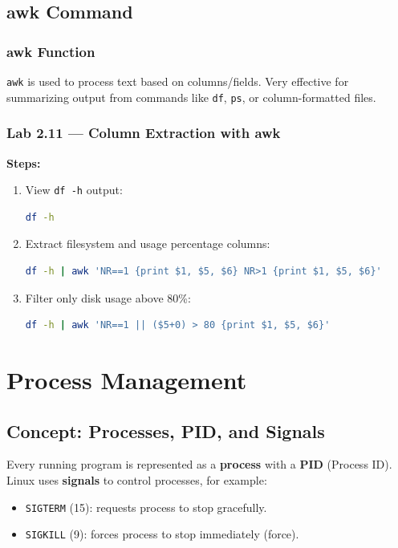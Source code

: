 \subsection{awk Command}
\subsubsection*{awk Function}
\texttt{awk} is used to process text based on columns/fields. Very effective for summarizing output from commands like \texttt{df}, \texttt{ps},
or column-formatted files.

\subsubsection*{Lab 2.11 --- Column Extraction with awk}
\textbf{Steps:}
\begin{enumerate}
    \item View \texttt{df -h} output:
\begin{lstlisting}[language=bash, caption={df -h output}]
df -h
\end{lstlisting}

    \item Extract filesystem and usage percentage columns:
\begin{lstlisting}[language=bash, caption={awk print specific columns}]
df -h | awk 'NR==1 {print $1, $5, $6} NR>1 {print $1, $5, $6}'
\end{lstlisting}

    \item Filter only disk usage above 80\%:
\begin{lstlisting}[language=bash, caption={awk filter by condition}]
df -h | awk 'NR==1 || ($5+0) > 80 {print $1, $5, $6}'
\end{lstlisting}
\end{enumerate}


\section{Process Management}
\label{sec:process-commands}

\subsection*{Concept: Processes, PID, and Signals}
Every running program is represented as a \textbf{process} with a \textbf{PID} (Process ID).
Linux uses \textbf{signals} to control processes, for example:
\begin{itemize}
    \item \texttt{SIGTERM} (15): requests process to stop gracefully.
    \item \texttt{SIGKILL} (9): forces process to stop immediately (force).
\end{itemize}

